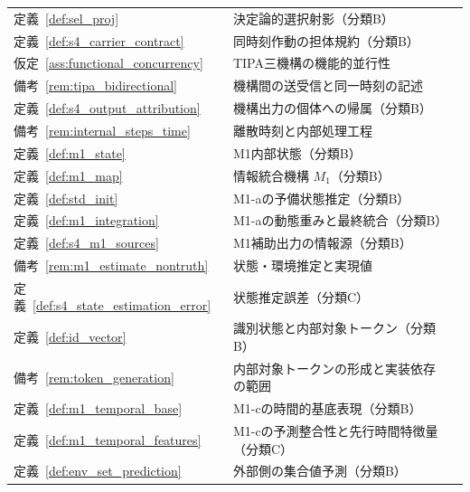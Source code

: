 \begingroup
\small
\setlength{\tabcolsep}{4pt}
\renewcommand{\arraystretch}{1.12}
\begin{longtable}{p{2.4cm} p{10.4cm} r}
定義~\ref{def:sel_proj} & 決定論的選択射影（分類B） & \pageref{def:sel_proj} \\
定義~\ref{def:s4_carrier_contract} & 同時刻作動の担体規約（分類B） & \pageref{def:s4_carrier_contract} \\
仮定~\ref{ass:functional_concurrency} & TIPA三機構の機能的並行性 & \pageref{ass:functional_concurrency} \\
備考~\ref{rem:tipa_bidirectional} & 機構間の送受信と同一時刻の記述 & \pageref{rem:tipa_bidirectional} \\
定義~\ref{def:s4_output_attribution} & 機構出力の個体への帰属（分類B） & \pageref{def:s4_output_attribution} \\
備考~\ref{rem:internal_steps_time} & 離散時刻と内部処理工程 & \pageref{rem:internal_steps_time} \\
定義~\ref{def:m1_state} & M1内部状態（分類B） & \pageref{def:m1_state} \\
定義~\ref{def:m1_map} & 情報統合機構 $M_1$（分類B） & \pageref{def:m1_map} \\
定義~\ref{def:std_init} & M1-aの予備状態推定（分類B） & \pageref{def:std_init} \\
定義~\ref{def:m1_integration} & M1-aの動態重みと最終統合（分類B） & \pageref{def:m1_integration} \\
定義~\ref{def:s4_m1_sources} & M1補助出力の情報源（分類B） & \pageref{def:s4_m1_sources} \\
備考~\ref{rem:m1_estimate_nontruth} & 状態・環境推定と実現値 & \pageref{rem:m1_estimate_nontruth} \\
定義~\ref{def:s4_state_estimation_error} & 状態推定誤差（分類C） & \pageref{def:s4_state_estimation_error} \\
定義~\ref{def:id_vector} & 識別状態と内部対象トークン（分類B） & \pageref{def:id_vector} \\
備考~\ref{rem:token_generation} & 内部対象トークンの形成と実装依存の範囲 & \pageref{rem:token_generation} \\
定義~\ref{def:m1_temporal_base} & M1-cの時間的基底表現（分類B） & \pageref{def:m1_temporal_base} \\
定義~\ref{def:m1_temporal_features} & M1-cの予測整合性と先行時間特徴量（分類C） & \pageref{def:m1_temporal_features} \\
定義~\ref{def:env_set_prediction} & 外部側の集合値予測（分類B） & \pageref{def:env_set_prediction} \\

\end{longtable}
